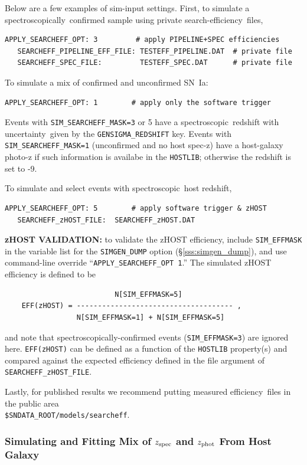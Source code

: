 \documentclass[12pt]{article}
\newcommand{\unc}{uncertainty}
\newcommand{\Zphot}{z_{\rm phot}}
\newcommand{\Zspec}{z_{\rm spec}}
\newcommand{\eff}{efficiency}
\newcommand{\spec}{spectroscopic}
\newcommand{\specy}{spectroscopically}
\begin{document}
{%
Below are a few examples of sim-input settings.
First, to simulate a \specy\ confirmed sample
using private search-\eff\ files,
%
\begin{Verbatim}[frame=single]
   APPLY_SEARCHEFF_OPT: 3         # apply PIPELINE+SPEC efficiencies
   SEARCHEFF_PIPELINE_EFF_FILE: TESTEFF_PIPELINE.DAT  # private file
   SEARCHEFF_SPEC_FILE:         TESTEFF_SPEC.DAT      # private file
\end{Verbatim}
%
To simulate a mix of confirmed and unconfirmed SN~Ia:
%
\begin{Verbatim}[frame=single]
   APPLY_SEARCHEFF_OPT: 1        # apply only the software trigger
\end{Verbatim}
Events with {\tt SIM\_SEARCHEFF\_MASK=3} or 5 have a \spec\ redshift
with \unc\ given by the {\tt GENSIGMA\_REDSHIFT} key.
Events with {\tt SIM\_SEARCHEFF\_MASK=1} (unconfirmed and no
host spec-z) have a host-galaxy photo-z
if such information is availabe in the {\tt HOSTLIB};
otherwise the redshift is set to -9.

\bigskip\noindent
To simulate and select events with \spec\ host redshift,
\begin{Verbatim}[frame=single]
   APPLY_SEARCHEFF_OPT: 5        # apply software trigger & zHOST
   SEARCHEFF_zHOST_FILE:  SEARCHEFF_zHOST.DAT
\end{Verbatim}

{\bf zHOST VALIDATION:}
to validate the zHOST efficiency, include {\tt SIM\_EFFMASK} in the
variable list for the {\tt SIMGEN\_DUMP} option (\S\ref{sss:simgen_dump}), 
and use command-line override  ``{\tt APPLY\_SEARCHEFF\_OPT 1}.'' 
The simulated zHOST efficiency is defined to be
\begin{verbatim}
                          N[SIM_EFFMASK=5]
    EFF(zHOST) = ------------------------------------- ,
                 N[SIM_EFFMASK=1] + N[SIM_EFFMASK=5] 
\end{verbatim}
and note that spectroscopically-confirmed events ({\tt SIM\_EFFMASK=3})
are ignored here.
{\tt EFF(zHOST)} can be defined as a function of the {\tt HOSTLIB}
property(s) and compared against the expected efficiency defined
in the file argument of {\tt SEARCHEFF\_zHOST\_FILE}.


\bigskip\noindent
Lastly, for published results we recommend putting measured \eff\ 
files in the public area \\ {\tt \$SNDATA\_ROOT/models/searcheff}.

  \clearpage
   \subsubsection{Simulating and Fitting Mix of $\Zspec$ and $\Zphot$ From Host Galaxy}
   \label{sssec:sim_zmix}

}
\end{document}

